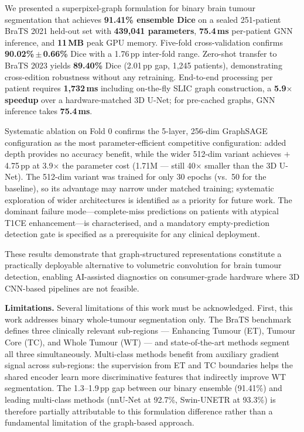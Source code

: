 \documentclass{article}
\begin{document}
We presented a superpixel-graph formulation for binary brain tumour segmentation
that achieves \textbf{91.41\% ensemble Dice} on a sealed 251-patient BraTS 2021
held-out set with \textbf{439,041 parameters}, \textbf{75.4\,ms} per-patient GNN
inference, and \textbf{11\,MB} peak GPU memory. Five-fold cross-validation confirms
\textbf{90.02\%\,$\pm$\,0.66\%} Dice with a 1.76\,pp inter-fold range. Zero-shot
transfer to BraTS 2023 yields \textbf{89.40\%} Dice (2.01\,pp gap, 1,245 patients),
demonstrating cross-edition robustness without any retraining. End-to-end processing
per patient requires \textbf{1,732\,ms} including on-the-fly SLIC graph construction,
a \textbf{5.9$\times$ speedup} over a hardware-matched 3D U-Net; for pre-cached
graphs, GNN inference takes \textbf{75.4\,ms}.

Systematic ablation on Fold 0 confirms the 5-layer, 256-dim GraphSAGE configuration
as the most parameter-efficient competitive configuration: added depth provides no
accuracy benefit, while the wider 512-dim variant achieves $+$4.75\,pp at
3.9$\times$ the parameter cost (1.71M --- still 40$\times$ smaller than the 3D
U-Net). The 512-dim variant was trained for only 30 epochs (vs.\ 50 for the
baseline), so its advantage may narrow under matched training; systematic
exploration of wider architectures is identified as a priority for future work. The
dominant failure mode---complete-miss predictions on patients with atypical T1CE
enhancement---is characterised, and a mandatory empty-prediction detection gate is
specified as a prerequisite for any clinical deployment.

These results demonstrate that graph-structured representations constitute a
practically deployable alternative to volumetric convolution for brain tumour
detection, enabling AI-assisted diagnostics on consumer-grade hardware where
3D CNN-based pipelines are not feasible.

\textbf{Limitations.}
Several limitations of this work must be acknowledged. First, this work addresses
binary whole-tumour segmentation only. The BraTS benchmark defines three clinically
relevant sub-regions --- Enhancing Tumour (ET), Tumour Core (TC), and Whole Tumour
(WT) --- and state-of-the-art methods segment all three simultaneously. Multi-class
methods benefit from auxiliary gradient signal across sub-regions: the supervision
from ET and TC boundaries helps the shared encoder learn more discriminative
features that indirectly improve WT segmentation. The 1.3--1.9\,pp gap between our
binary ensemble (91.41\%) and leading multi-class methods (nnU-Net at 92.7\%,
Swin-UNETR at 93.3\%) is therefore partially attributable to this formulation
difference rather than a fundamental limitation of the graph-based approach.
\end{document}
